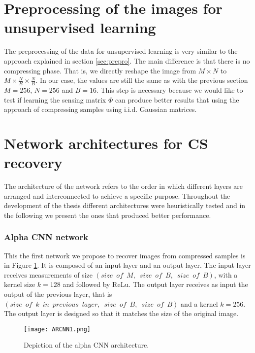 \FloatBarrier

\section{Preprocessing of the images for unsupervised learning} \label{sec:preproun}
The preprocessing of the data for unsupervised learning is very similar to the approach explained in section \ref{sec:prepro}. The main difference is that there is no compressing phase. That is, we directly reshape the image from $M \times N$ to $M \times \frac{N}{B} \times \frac{N}{B}$. In our case, the values are still the same as with the previous section $M = 256$, $N = 256$ and $B = 16$. This step is necessary because we would like to test if learning the sensing matrix $\Phi$ can produce better results that using the approach of compressing samples using i.i.d. Gaussian matrices.    

\FloatBarrier

\section{Network architectures for CS recovery}
The architecture of the network refers to the order in which different layers are arranged and interconnected to achieve a specific purpose. Throughout the development of the thesis different architectures were heuristically tested and in the following we present the ones that produced better performance.

\FloatBarrier

\subsubsection{Alpha CNN network} \label{ch:alphaNet}
This the first network we propose to recover images from compressed samples is in Figure \ref{fig:ARCNNim1}. It is composed of an input layer and an output layer. The input layer receives measurements of size $(size \enspace of \enspace M ,\enspace size \enspace of \enspace B , \enspace size \enspace of \enspace B)$, with a kernel size $k=128$ and followed by ReLu. The output layer receives as input the output of the previous layer, that is $(size \enspace of \enspace k \enspace in \enspace previous \enspace layer ,\enspace size \enspace of \enspace B , \enspace size \enspace of \enspace B)$ and a kernel $k=256$. The output layer is designed so that it matches the size of the original image.  
\begin{figure}[tb] 
\centering 
\texttt{[image: ARCNN1.png]} 
\caption[Alpha CNN architecture for recovery ]{Depiction of the alpha CNN architecture.}
\label{fig:ARCNNim1} 
\end{figure}

